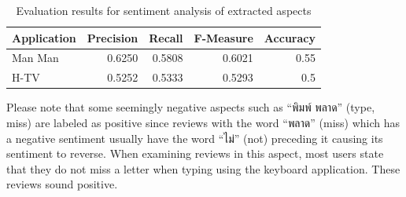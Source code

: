 
\begin{table}[!htbp]
	\caption{Evaluation results for sentiment analysis of extracted aspects}
	\label{table:f-measureTopic}
	\centering
	\begin{tabular}{|l|r|r|r|r|}
		\hline
		\multicolumn{1}{|c|}{\textbf{Application}} & 
		\multicolumn{1}{|c|}{\textbf{Precision}} &
		\multicolumn{1}{|c|}{\textbf{Recall}} &
		\multicolumn{1}{|c|}{\textbf{F-Measure}} &
		\multicolumn{1}{|c|}{\textbf{Accuracy}} \\
		\hline
		Man Man & 
		0.6250
		& 
		0.5808
		& 
		0.6021
		& 
		0.55
		\\
		\hline
		H-TV & 0.5252 & 0.5333 & 0.5293 & 0.5\\
		\hline
	\end{tabular}
\end{table}


Please note that some seemingly negative aspects such as 
\enquote{{พิมพ์ พลาด}} (type, miss) are labeled as positive since reviews with the word \enquote{{พลาด}} (miss) which has a negative sentiment usually have the word \enquote{{ไม่}} (not) preceding it causing its sentiment to reverse. When examining reviews in this aspect, most users state that they do not miss a letter when typing using the keyboard application. These reviews sound positive. 


